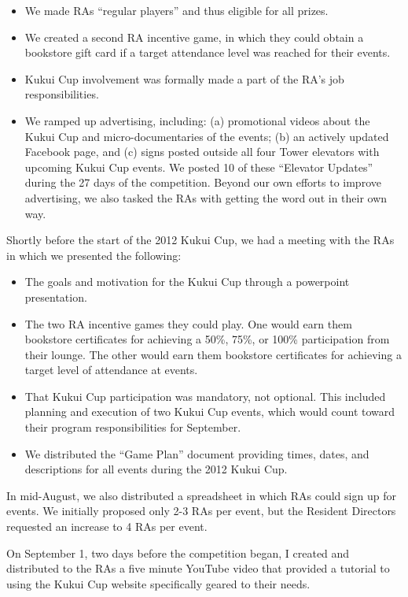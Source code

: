 \documentclass[]{article}
\begin{document}
\begin{itemize}[noitemsep]
\item We made RAs ``regular players'' and thus eligible for all prizes. 

\item We created a second RA incentive game, in which they could obtain a
bookstore gift card if a target attendance level was reached for their events.  

\item Kukui Cup involvement was formally made a part of the RA's job responsibilities. 

\item We ramped up advertising, including: (a) promotional videos about the Kukui Cup and
micro-documentaries of the events; (b) an actively updated Facebook page, and (c) signs
posted outside all four Tower elevators with upcoming Kukui Cup events.  We posted 10 of
these ``Elevator Updates'' during the 27 days of the competition.  Beyond our own efforts
to improve advertising, we also tasked the RAs with getting the word out in their own
way. 
\end{itemize}

Shortly before the start of the 2012 Kukui Cup, we had a meeting with the RAs in which we presented the following:
\begin{itemize}[noitemsep]
\item The goals and motivation for the Kukui Cup through a powerpoint presentation.
\item The two RA incentive games they could play. One would earn them bookstore
  certificates for achieving a 50\%, 75\%, or 100\% participation from their lounge. The
  other would earn them bookstore certificates for achieving a target level of attendance
  at events. 
\item That Kukui Cup participation was mandatory, not optional.   This included planning and execution of two
  Kukui Cup events, which would count toward their program responsibilities for September.
\item We distributed the ``Game Plan'' document providing times, dates, and descriptions
  for all events during the 2012 Kukui Cup. 
\end{itemize}

In mid-August, we also distributed a spreadsheet in which RAs could sign up for events.  We initially
proposed only 2-3 RAs per event, but the Resident Directors requested an increase to 4 RAs per event. 

On September 1, two days before the competition began, I created and distributed to the
RAs a five minute YouTube video that provided a tutorial to using the Kukui Cup website
specifically geared to their needs.
\end{document}

